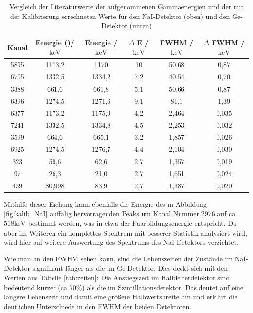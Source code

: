 \documentclass[
	parskip=half,10pt,
	numbers= noenddot, %
	toc=flat, %
	oneside,
	twocolumn,
	]{scrartcl}
\begin{document}
\begin{table}[t]
\centering
\begin{tabular}{cccccc}
Kanal & Energie (\cite{kohlrausch})/$\si{\kilo \electronvolt}$ & Energie /$\si{\kilo \electronvolt}$&$\Delta$ E /$\si{\kilo \electronvolt}$& FWHM 
/$\si{\kilo \electronvolt}$& $\Delta$ FWHM /$\si{\kilo \electronvolt}$\\
\hline
5895 & 1173,2 & 1170 & 10 & 50,68 & 0,87\\
6705 & 1332,5 & 1334,2 & 7,2 & 40,54 & 0,70\\
3388 & 661,6 & 661,8 & 5,1 & 50,66 & 0,87\\
6396 & 1274,5 & 1271,6 & 9,1 & 81,1 & 1,39\\
\hline
6377 & 1173,2 & 1175,9 & 4,2 & 2,464 & 0,035\\
7241 & 1332,5 & 1334,8 & 4,5 & 2,253 & 0,032\\
3599 & 664,6 & 665,1   & 3,2 & 1,857 & 0,026\\
6925 & 1274,5 & 1276,7 & 4,4 & 2,104 & 0,030\\
323 & 59,6 & 62,6      & 2,7 & 1,357 & 0,019\\
97 & 26,3 & 21,0       & 2,7 & 1,651 & 0,024\\
439 & 80,998 & 83,9    & 2,7 & 1,387 & 0,020
\end{tabular}
\caption{Vergleich der Literaturwerte der aufgenommenen Gammaenergien und der mit der Kalibrierung errechneten Werte für den NaI-Detektor (oben) und den Ge-Detektor 
(unten)}
\label{tab:kalib_fertig}
\end{table}

Mithilfe dieser Eichung kann ebenfalls die Energie des in Abbildung \ref{fig:kalib_NaI} auffälig hervorragenden Peaks um Kanal Nummer 2976 auf ca. 
$518 \si{\kilo \electronvolt}$ bestimmt werden, was in etwa der Paarbildungsenergie entspricht. Da aber im Weiteren ein komplettes Spektrum mit besserer Statistik 
analysiert wird, wird hier auf weitere Auswertung des Spektrums des NaI-Detektors verzichtet. 

Wie man an den FWHM sehen kann, sind die Lebenszeiten der Zustände im NaI-Detektor signifikant länger als die im Ge-Detektor. Dies deckt sich mit den Werten aus 
Tabelle \ref{tab:zeiten}: Die Anstiegszeit im Halbleiterdetektor sind bedeutend kürzer (ca $ 70 \%$) als die im Szintillationsdetektor.  Das deutet auf eine 
längere Lebenszeit und damit eine größere Halbwertsbreite hin und erklärt die deutlichen Unterschiede in den FWHM der beiden Detektoren. 
\end{document}
